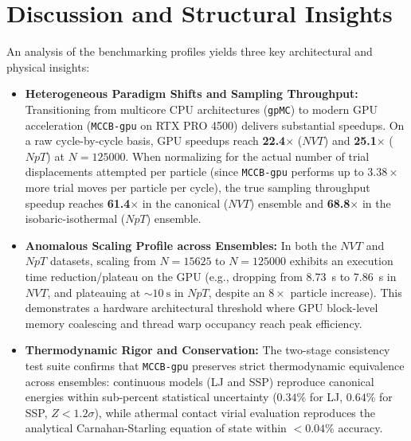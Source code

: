 \documentclass[12pt]{article}
\begin{document}
\section{Discussion and Structural Insights}
An analysis of the benchmarking profiles yields three key architectural and physical insights:
\begin{itemize}
    \item \textbf{Heterogeneous Paradigm Shifts and Sampling Throughput:} Transitioning from multicore CPU architectures (\texttt{gpMC}) to modern GPU acceleration (\texttt{MCCB-gpu} on RTX PRO 4500) delivers substantial speedups. On a raw cycle-by-cycle basis, GPU speedups reach \textbf{22.4$\times$} ($NVT$) and \textbf{25.1$\times$} ($NpT$) at $N = \num{125000}$. When normalizing for the actual number of trial displacements attempted per particle (since \texttt{MCCB-gpu} performs up to $3.38\times$ more trial moves per particle per cycle), the true sampling throughput speedup reaches \textbf{61.4$\times$} in the canonical ($NVT$) ensemble and \textbf{68.8$\times$} in the isobaric-isothermal ($NpT$) ensemble.
    \item \textbf{Anomalous Scaling Profile across Ensembles:} In both the $NVT$ and $NpT$ datasets, scaling from $N = \num{15625}$ to $N = \num{125000}$ exhibits an execution time reduction/plateau on the GPU (e.g., dropping from \SI{8.73}{\second} to \SI{7.86}{\second} in $NVT$, and plateauing at $\sim \SI{10}{\second}$ in $NpT$, despite an $8\times$ particle increase). This demonstrates a hardware architectural threshold where GPU block-level memory coalescing and thread warp occupancy reach peak efficiency.
    \item \textbf{Thermodynamic Rigor and Conservation:} The two-stage consistency test suite confirms that \texttt{MCCB-gpu} preserves strict thermodynamic equivalence across ensembles: continuous models (LJ and SSP) reproduce canonical energies within sub-percent statistical uncertainty ($0.34\%$ for LJ, $0.64\%$ for SSP, $Z < 1.2\sigma$), while athermal contact virial evaluation reproduces the analytical Carnahan-Starling equation of state within $\mathbf{< 0.04\%}$ accuracy.
\end{itemize}
\end{document}
